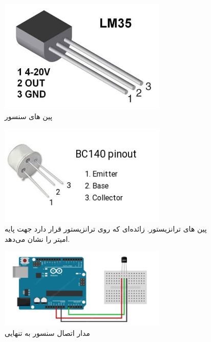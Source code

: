 \newline
\begin{figure}[h]
    \centering
    \includegraphics[width=8cm]{lm35.png}
    \caption{پین های سنسور}
    \label{fig:lm35}
\end{figure}
\newline

\newline
\begin{figure}[h]
    \centering
    \includegraphics[width=8cm]{bc140.png}
    \caption{پین های ترانزیستور. زائده‌ای که روی ترانزیستور قرار دارد جهت پایه امیتر را نشان می‌دهد.}
    \label{fig:lm35}
\end{figure}
\newline

\newline
\begin{figure}[h]
    \centering
    \includegraphics[width=8cm]{l5_c1.png}
    \caption{مدار اتصال سنسور به تنهایی}
    \label{fig:l5-c2}
\end{figure}
\newline

